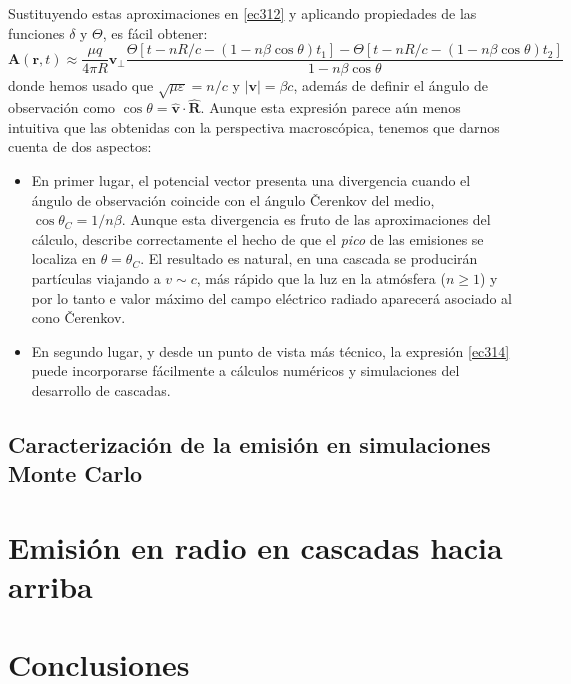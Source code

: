 \documentclass[12 pt, a4paper]{article} %
\numberwithin{equation}{section}
\numberwithin{figure}{section}
\newcommand{\vect}[1]{\boldsymbol{\mathbf{#1}}}
\begin{document}
Sustituyendo estas aproximaciones en \eqref{ec312} y aplicando propiedades de las funciones $\delta$ y $\Theta$, es fácil obtener:
\begin{equation}
	\vect{A}\left(\vect{r}, t\right)\approx\frac{\mu q}{4\pi R}\vect{v}_\perp\frac{\Theta\left[t-nR/c-\left(1-n\beta\cos{\theta}\right)t_1\right]-\Theta\left[t-nR/c-\left(1-n\beta\cos{\theta}\right)t_2\right]}{1-n\beta\cos{\theta}}\label{ec314}
\end{equation}
donde hemos usado que $\sqrt{\mu\varepsilon}=n/c$ y $\left|\vect{v}\right|=\beta c$, además de definir el ángulo de observación como $\cos{\theta}=\hat{\vect{v}}\cdot\hat{\vect{R}}$. Aunque esta expresión parece aún menos intuitiva que las obtenidas con la perspectiva macroscópica, tenemos que darnos cuenta de dos aspectos:
\begin{itemize}
	\item En primer lugar, el potencial vector presenta una divergencia cuando el ángulo de observación coincide con el ángulo \v{C}erenkov del medio, $\cos{\theta_C}=1/n\beta$. Aunque esta divergencia es fruto de las aproximaciones del cálculo, describe correctamente el hecho de que el \textit{pico} de las emisiones se localiza en $\theta=\theta_C$. El resultado es natural, en una cascada se producirán partículas viajando a $v\sim c$, más rápido que la luz en la atmósfera ($n\geq 1$) y por lo tanto e valor máximo del campo eléctrico radiado aparecerá asociado al cono \v{C}erenkov.
	\item En segundo lugar, y desde un punto de vista más técnico, la expresión \eqref{ec314} puede incorporarse fácilmente a cálculos numéricos y simulaciones del desarrollo de cascadas.
\end{itemize} 

	\subsection{Caracterización de la emisión en simulaciones Monte Carlo}
	\clearpage

	\section{Emisión en radio en cascadas hacia arriba}
	\clearpage %
	\section{Conclusiones}
	
	
	\clearpage
	\appendix
	\nocite{*}
	
	

	
\end{document}
